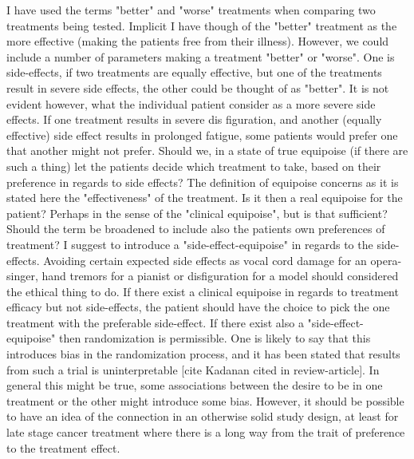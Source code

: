\documentclass[12p]{article}
\begin{document}
I have used the terms "better" and "worse" treatments when comparing two treatments being tested.
Implicit I have though of the "better" treatment as the more effective (making the patients free from their illness).
However, we could include a number of parameters making a treatment "better" or "worse".
One is side-effects, if two treatments are equally effective, but one of the treatments result in severe side effects, the other could be thought of as "better".
It is not evident however, what the individual patient consider as a more severe side effects.
If one treatment results in severe dis figuration, and another (equally effective) side effect results in prolonged fatigue, some patients would prefer one that another might not prefer.
Should we, in a state of true equipoise (if there are such a thing) let the patients decide which treatment to take, based on their preference in regards to side effects?
The definition of equipoise concerns as it is stated here the "effectiveness" of the treatment.
Is it then a real equipoise for the patient?
Perhaps in the sense of the "clinical equipoise", but is that sufficient?
Should the term be broadened to include also the patients own preferences of treatment?
I suggest to introduce a "side-effect-equipoise" in regards to the side-effects.
Avoiding certain expected side effects as vocal cord damage for an opera-singer, hand tremors for a pianist or disfiguration for a model should considered the ethical thing to do.
If there exist a clinical equipoise in regards to treatment efficacy but not side-effects, the patient should have the choice to pick the one treatment with the preferable side-effect.
If there exist also a "side-effect-equipoise" then randomization is permissible.
One is likely to say that this introduces bias in the randomization process, and it has been stated that results from such a trial is uninterpretable [cite Kadanan cited in review-article].
In general this might be true, some associations between the desire to be in one treatment or the other might introduce some bias.
However, it should be possible to have an idea of the connection in an otherwise solid study design, at least for late stage cancer treatment where there is a long way from the trait of preference to the treatment effect.


%
\end{document}

